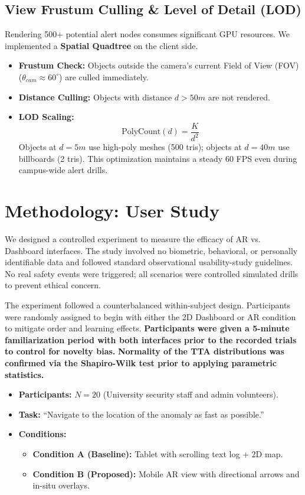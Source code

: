 \documentclass[conference]{IEEEtran}
\begin{document}
\subsection{View Frustum Culling \& Level of Detail (LOD)}
Rendering 500+ potential alert nodes consumes significant GPU resources. We implemented a \textbf{Spatial Quadtree} on the client side.
\begin{itemize}
    \item \textbf{Frustum Check:} Objects outside the camera's current Field of View (FOV) ($ \theta_{cam} \approx 60^\circ $) are culled immediately.
    \item \textbf{Distance Culling:} Objects with distance $d > 50m$ are not rendered.
    \item \textbf{LOD Scaling:}
    \begin{equation}
    \text{PolyCount}(d) = \frac{K}{d^2}
    \end{equation}
    Objects at $d=5m$ use high-poly meshes (500 tris); objects at $d=40m$ use billboards (2 tris). This optimization maintains a steady 60 FPS even during campus-wide alert drills.
\end{itemize}

\section{Methodology: User Study}

We designed a controlled experiment to measure the efficacy of AR vs. Dashboard interfaces. The study involved no biometric, behavioral, or personally identifiable data and followed standard observational usability-study guidelines. No real safety events were triggered; all scenarios were controlled simulated drills to prevent ethical concern.

The experiment followed a counterbalanced within-subject design. Participants were randomly assigned to begin with either the 2D Dashboard or AR condition to mitigate order and learning effects. \textbf{Participants were given a 5-minute familiarization period with both interfaces prior to the recorded trials to control for novelty bias.} \textbf{Normality of the TTA distributions was confirmed via the Shapiro-Wilk test prior to applying parametric statistics.}

\begin{itemize}
    \item \textbf{Participants:} $N=20$ (University security staff and admin volunteers).
    \item \textbf{Task:} ``Navigate to the location of the anomaly as fast as possible.''
    \item \textbf{Conditions:}
        \begin{itemize}
            \item \textbf{Condition A (Baseline):} Tablet with scrolling text log + 2D map.
            \item \textbf{Condition B (Proposed):} Mobile AR view with directional arrows and in-situ overlays.
        \end{itemize}
\end{itemize}
\end{document}
